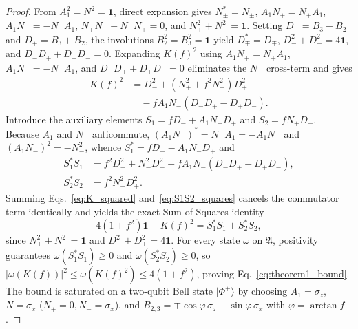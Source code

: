 \begin{proof}
From $A_1^2 = N^2 = \mathbf{1}$, direct expansion gives $N_\pm^* = N_\pm$, $A_1 N_+ = N_+ A_1$, $A_1 N_- = -N_- A_1$, $N_+ N_- + N_- N_+ = 0$, and $N_+^2 + N_-^2 = \mathbf{1}$. Setting $D_- = B_3 - B_2$ and $D_+ = B_3 + B_2$, the involutions $B_2^2 = B_3^2 = \mathbf{1}$ yield $D_\mp^* = D_\mp$, $D_-^2 + D_+^2 = 4\mathbf{1}$, and $D_- D_+ + D_+ D_- = 0$. Expanding $K(f)^2$ using $A_1 N_+ = N_+ A_1$, $A_1 N_- = -N_- A_1$, and $D_- D_+ + D_+ D_- = 0$ eliminates the $N_+$ cross-term and gives
\begin{equation}\label{eq:K_squared}
\begin{aligned}
K(f)^2 &= D_-^2 + (N_+^2 + f^2 N_-^2) D_+^2 \\
       &\quad - f A_1 N_- (D_- D_+ - D_+ D_-).
\end{aligned}
\end{equation}
Introduce the auxiliary elements $S_1 = f D_- + A_1 N_- D_+$ and $S_2 = f N_+ D_+$. Because $A_1$ and $N_-$ anticommute, $(A_1 N_-)^* = N_- A_1 = -A_1 N_-$ and $(A_1 N_-)^2 = -N_-^2$, whence $S_1^* = f D_- - A_1 N_- D_+$ and
\begin{equation}\label{eq:S1S2_squares}
\begin{aligned}
S_1^* S_1 &= f^2 D_-^2 + N_-^2 D_+^2 + f A_1 N_- (D_- D_+ - D_+ D_-), \\
S_2^* S_2 &= f^2 N_+^2 D_+^2.
\end{aligned}
\end{equation}
Summing Eqs.~\eqref{eq:K_squared} and~\eqref{eq:S1S2_squares} cancels the commutator term identically and yields the exact Sum-of-Squares identity
\begin{equation}\label{eq:sos_identity}
4(1 + f^2)\mathbf{1} - K(f)^2 = S_1^* S_1 + S_2^* S_2,
\end{equation}
since $N_+^2 + N_-^2 = \mathbf{1}$ and $D_-^2 + D_+^2 = 4\mathbf{1}$. For every state $\omega$ on $\mathfrak{A}$, positivity guarantees $\omega(S_1^* S_1) \ge 0$ and $\omega(S_2^* S_2) \ge 0$, so $|\omega(K(f))|^2 \le \omega(K(f)^2) \le 4(1 + f^2)$, proving Eq.~\eqref{eq:theorem1_bound}. The bound is saturated on a two-qubit Bell state $|\Phi^+\rangle$ by choosing $A_1 = \sigma_z$, $N = \sigma_x$ ($N_+ = 0, N_- = \sigma_x$), and $B_{2,3} = \mp \cos\varphi\,\sigma_z - \sin\varphi\,\sigma_x$ with $\varphi = \arctan f$.
\end{proof}

